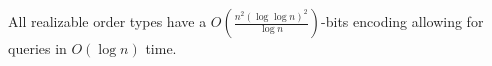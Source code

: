 \begin{contribution}[label=thm:realizable,restate=TheoremGPTRealizable]
  All realizable order types have
  a
  \(O(\frac{n^2 {(\log \log n)}^2}{\log n})\)-bits
  encoding
  allowing for queries in \(O(\log n)\) time.
\end{contribution}
